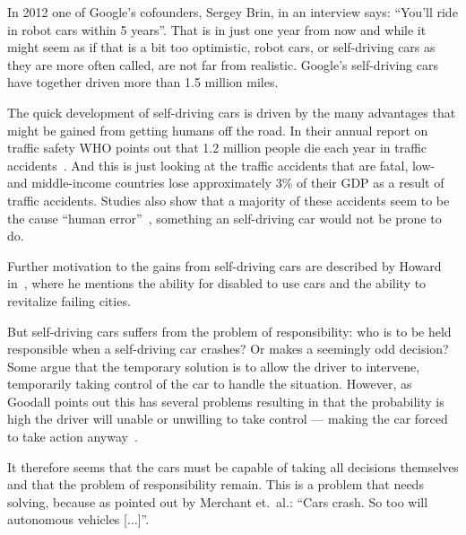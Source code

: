 In 2012 one of Google's cofounders, Sergey Brin, in an interview says: ``You'll
ride in robot cars within 5 years''. That is in just one year from now and while
it might seem as if that is a bit too optimistic, robot cars, or self-driving
cars as they are more often called, are not far from realistic. Google's
self-driving cars have together driven more than 1.5 million miles.

The quick development of self-driving cars is driven by the many advantages that
might be gained from getting humans off the road. In their annual report on
traffic safety WHO points out that 1.2 million people die each year in traffic
accidents~\cite{worldhealthorganization_2015_global_gsrors2sadoa}. And this is
just looking at the traffic accidents that are fatal, low- and middle-income
countries lose approximately 3\% of their GDP as a result of traffic accidents.
Studies also show that a majority of these accidents seem to be the cause
``human error''~\cite{relative_trfoudas}, something an self-driving car would
not be prone to do.

Further motivation to the gains from self-driving cars are described by Howard
in~\cite{howard_science_smbarotrtmiotdc}, where he mentions the ability for
disabled to use cars and the ability to revitalize failing cities.

But self-driving cars suffers from the problem of responsibility: who is to be
held responsible when a self-driving car crashes? Or makes a seemingly odd
decision? Some argue that the temporary solution is to allow the driver to
intervene, temporarily taking control of the car to handle the situation.
However, as Goodall points out this has several problems resulting in that the
probability is high the driver will unable or unwilling to take control ---
making the car forced to take action anyway~\cite{goodall_2014_machine_meaav}.

It therefore seems that the cars must be capable of taking all decisions
themselves and that the problem of responsibility remain. This is a problem that
needs solving, because as pointed out by Merchant et.\ al.:
``Cars crash. So too will autonomous vehicles [$\ldots$]''.

